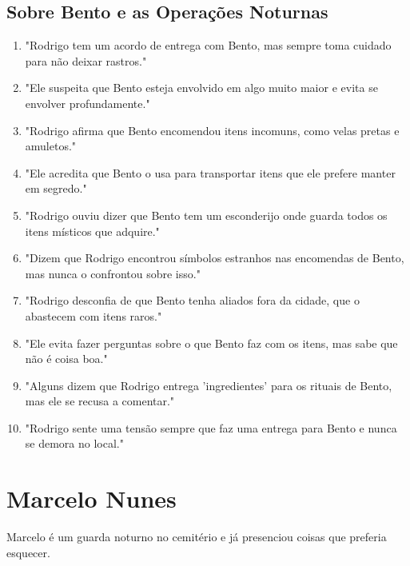 \subsection*{Sobre Bento e as Operações Noturnas}
\begin{enumerate}
    \item "Rodrigo tem um acordo de entrega com Bento, mas sempre toma cuidado para não deixar rastros."
    \item "Ele suspeita que Bento esteja envolvido em algo muito maior e evita se envolver profundamente."
    \item "Rodrigo afirma que Bento encomendou itens incomuns, como velas pretas e amuletos."
    \item "Ele acredita que Bento o usa para transportar itens que ele prefere manter em segredo."
    \item "Rodrigo ouviu dizer que Bento tem um esconderijo onde guarda todos os itens místicos que adquire."
    \item "Dizem que Rodrigo encontrou símbolos estranhos nas encomendas de Bento, mas nunca o confrontou sobre isso."
    \item "Rodrigo desconfia de que Bento tenha aliados fora da cidade, que o abastecem com itens raros."
    \item "Ele evita fazer perguntas sobre o que Bento faz com os itens, mas sabe que não é coisa boa."
    \item "Alguns dizem que Rodrigo entrega 'ingredientes' para os rituais de Bento, mas ele se recusa a comentar."
    \item "Rodrigo sente uma tensão sempre que faz uma entrega para Bento e nunca se demora no local."
\end{enumerate}

\section{Marcelo Nunes}
Marcelo é um guarda noturno no cemitério e já presenciou coisas que preferia esquecer.

